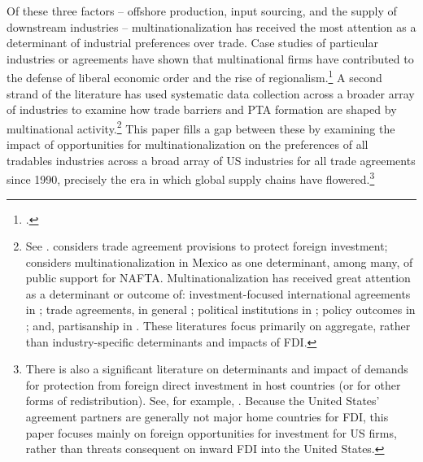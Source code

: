\documentclass[hidelinks,12pt,letter]{article}
\begin{document}
Of these three factors -- offshore production, input sourcing, and the supply of downstream industries -- multinationalization has received the most attention as a determinant of industrial preferences over trade. Case studies of particular industries or agreements have shown that multinational firms have contributed to the defense of liberal economic order and the rise of regionalism.\footnote{\citealt{milner1988trading, milner1988resisting, manger2005competition}.} A second strand of the literature has used systematic data collection across a broader array of industries to examine how trade barriers and PTA formation are shaped by multinational activity.\footnote{See \citealt{manger2014economic, manger2012vertical, lee2014outward, jensen2014influences}. \citealt{kim2016firms} 
considers trade agreement provisions to protect foreign investment; \citealt{dreiling2000class} considers multinationalization in Mexico as one determinant, among many, of public support for NAFTA. Multinationalization has received great attention as a determinant or outcome of: investment-focused international agreements in \citealt{elkins2006competing, kerner2009should, jandhyala2011three}; trade agreements, in general \citealt{buthe2008politics}; political institutions in \citealt{jensen2003democratic, jensen2012fiscal}; policy outcomes in \citealt{jensen2014unbundling}; and, partisanship in \citealt{pinto2013partisan, pinto2008politics}. These literatures focus primarily on aggregate, rather than industry-specific determinants and impacts of FDI.} This paper fills a gap between these by examining the impact of opportunities for multinationalization on the preferences of all tradables industries across a broad array of US industries for all trade agreements since 1990, precisely the era in which global supply chains have flowered.\footnote{There is also a significant literature on determinants and impact of demands for protection from foreign direct investment in host countries (or for other forms of redistribution). See, for example, \citealt{
blanchard2010reevaluating,owen2013unionization,
blanchard2015us}. Because the United States' agreement partners are generally not major home countries for FDI, this paper focuses mainly on foreign opportunities for investment for US firms, rather than threats consequent on inward FDI into the United States.} %
\end{document}
